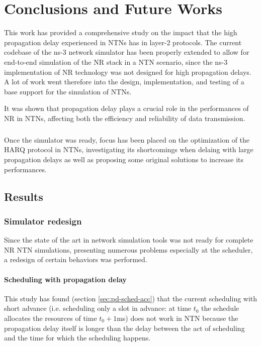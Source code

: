 
\chapter{Conclusions and Future Works}
\label{chp:conclusions}

This work has provided a comprehensive study on the impact that the high propagation delay experienced in \ac{NTN}s has in layer-2 protocols. The current codebase of the ns-3 network simulator has been properly extended to allow for end-to-end simulation of the \ac{NR} stack in a \ac{NTN} scenario, since the ns-3 implementation of \ac{NR} technology was not designed for high propagation delays. A lot of work went therefore into the design, implementation, and testing of a base support for the simulation of \ac{NTN}s.

It was shown that propagation delay plays a crucial role in the performances of \ac{NR} in \ac{NTN}s, affecting both the efficiency and reliability of data transmission.

\paragraph{}
Once the simulator was ready, focus has been placed on the optimization of the \ac{HARQ} protocol in \ac{NTN}s, investigating its shortcomings when delaing with large propagation delays as well as proposing some original solutions to increase its performances.

\section{Results}
\subsection{Simulator redesign}
Since the state of the art in network simulation tools was not ready for complete \ac{NR} \ac{NTN} simulations, presenting numerous problems especially at the scheduler, a redesign of certain behaviors was performed.

\subsubsection{Scheduling with propagation delay}
This study has found (section \ref{sec:pd-sched-acc}) that the current scheduling with short advance (i.e. scheduling only a slot in advance: at time $t_0$ the schedule allocates the resources of time $t_0+1$ms) does not work in \ac{NTN} because the propagation delay itself is longer than the delay between the act of scheduling and the time for which the scheduling happens. 

